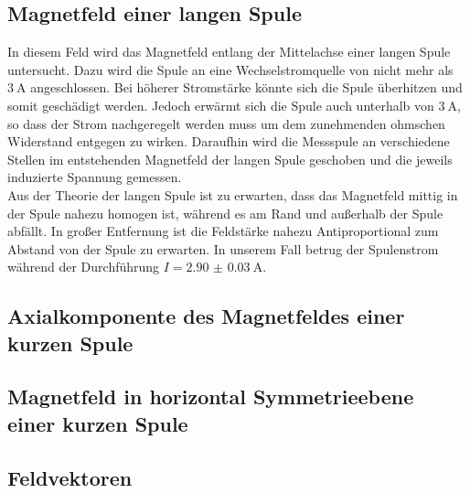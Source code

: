 \subsection{Magnetfeld einer langen Spule}
In diesem Feld wird das Magnetfeld entlang der Mittelachse einer langen Spule untersucht. Dazu wird die Spule an eine Wechselstromquelle von nicht mehr als $ \SI{3}{\ampere} $ angeschlossen. Bei höherer Stromstärke könnte sich die Spule überhitzen und somit geschädigt werden. Jedoch erwärmt sich die Spule auch unterhalb von $ \SI{3}{\ampere} $, so dass der Strom nachgeregelt werden muss um dem zunehmenden ohmschen Widerstand entgegen zu wirken. Daraufhin wird die Messspule an verschiedene Stellen im entstehenden Magnetfeld der langen Spule geschoben und die jeweils induzierte Spannung gemessen. \\
Aus der Theorie der langen Spule ist zu erwarten, dass das Magnetfeld mittig in der Spule nahezu homogen ist, während es am Rand und außerhalb der Spule abfällt. In großer Entfernung ist die Feldstärke nahezu Antiproportional zum Abstand von der Spule zu erwarten.
In unserem Fall betrug der Spulenstrom während der Durchführung $ I = \SI{2.90(3)}{\ampere} $.


\subsection{Axialkomponente des Magnetfeldes einer kurzen Spule}

\subsection{Magnetfeld in horizontal Symmetrieebene einer kurzen Spule}

\subsection{Feldvektoren}

